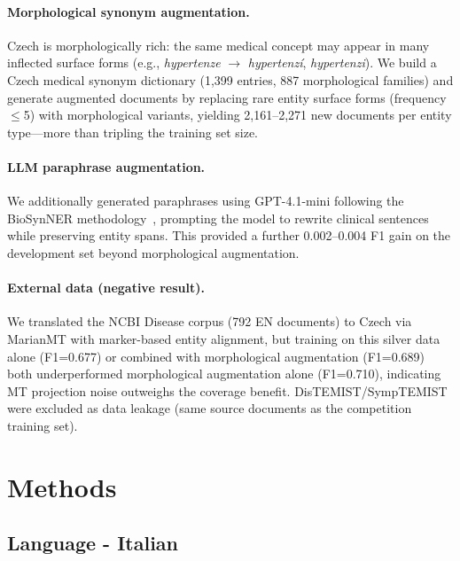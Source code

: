\documentclass[11pt]{article}
\begin{document}
\paragraph{Morphological synonym augmentation.}
Czech is morphologically rich: the same medical concept may appear in many inflected surface
forms (e.g., \textit{hypertenze} $\to$ \textit{hypertenz\'{i}}, \textit{hypertenzi}).
We build a Czech medical synonym dictionary (1,399 entries, 887 morphological families) and
generate augmented documents by replacing rare entity surface forms (frequency $\leq$5)
with morphological variants, yielding 2,161--2,271 new documents per entity type---more
than tripling the training set size.

\paragraph{LLM paraphrase augmentation.}
We additionally generated paraphrases using GPT-4.1-mini following the BioSynNER
methodology~\cite{multiclinai2026}, prompting the model to rewrite clinical sentences
while preserving entity spans. This provided a further 0.002--0.004 F1 gain on the
development set beyond morphological augmentation.

\paragraph{External data (negative result).}
We translated the NCBI Disease corpus (792 EN documents) to Czech via MarianMT with
marker-based entity alignment, but training on this silver data alone (F1=0.677) or
combined with morphological augmentation (F1=0.689) both underperformed morphological
augmentation alone (F1=0.710), indicating MT projection noise outweighs the coverage
benefit. DisTEMIST/SympTEMIST were excluded as data leakage (same source documents as
the competition training set).


\section{Methods}

\subsection{Language - Italian}
\end{document}
